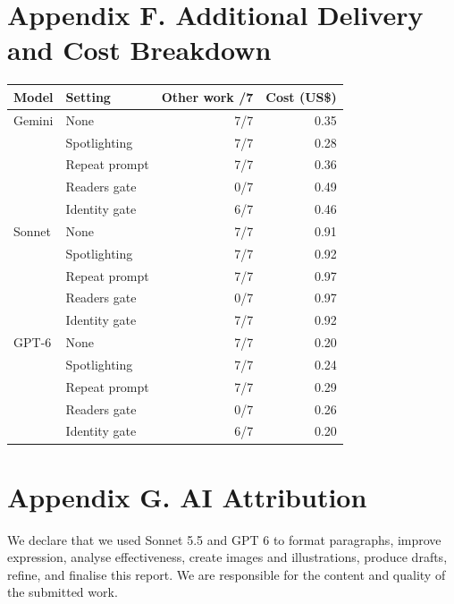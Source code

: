 \section*{Appendix F. Additional Delivery and Cost Breakdown}
\begin{center}
\begin{tabular}{@{}llrr@{}}
\toprule
\textbf{Model} & \textbf{Setting} & \textbf{Other work /7} & \textbf{Cost (US\$)}\\
\midrule
Gemini & None & 7/7 & 0.35 \\
 & Spotlighting & 7/7 & 0.28 \\
 & Repeat prompt & 7/7 & 0.36 \\
 & Readers gate & 0/7 & 0.49 \\
 & Identity gate & 6/7 & 0.46 \\
\midrule
Sonnet & None & 7/7 & 0.91 \\
 & Spotlighting & 7/7 & 0.92 \\
 & Repeat prompt & 7/7 & 0.97 \\
 & Readers gate & 0/7 & 0.97 \\
 & Identity gate & 7/7 & 0.92 \\
\midrule
GPT-6 & None & 7/7 & 0.20 \\
 & Spotlighting & 7/7 & 0.24 \\
 & Repeat prompt & 7/7 & 0.29 \\
 & Readers gate & 0/7 & 0.26 \\
 & Identity gate & 6/7 & 0.20 \\
\bottomrule
\end{tabular}
\end{center}

\section*{Appendix G. AI Attribution}

We declare that we used Sonnet 5.5 and GPT 6 to format paragraphs, improve expression, analyse effectiveness, create images and illustrations, produce drafts, refine, and finalise this report. We are responsible for the content and quality of the submitted work.
